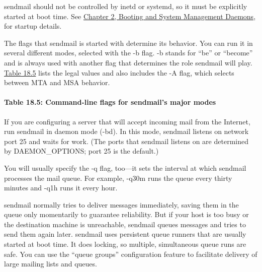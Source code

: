 \protect\hypertarget{part0026_split_026.htmlux5cux23_idIndexMarker2499}{}{}{sendmail}
should not be controlled by {inetd} or {systemd}, so it must be
explicitly started at boot time. See
\protect\hyperlink{part0009_split_000.htmlux5cux23_idTextAnchor065}{Chapter
2, {Booting and System Management Daemons}}, for startup details.

The flags that {sendmail} is started with determine its behavior. You
can run it in several different modes, selected with the {-b} flag. {-b}
stands for ``be'' or ``become'' and is always used with another flag
that determines the role {sendmail} will play.
\protect\hyperlink{part0026_split_026.htmlux5cux23_idTextAnchor1048}{Table
18.5} lists the legal values and also includes the {-A} flag, which
selects between MTA and MSA behavior.

\paragraph[{Table 18.5: }Command-line flags for {sendmail}'s major
modes]{\texorpdfstring{{Table 18.5:
}\protect\hypertarget{part0026_split_026.htmlux5cux23_idIndexMarker2500}{}{}\protect\hypertarget{part0026_split_026.htmlux5cux23_idTextAnchor1048}{}{}\protect\hypertarget{part0026_split_026.htmlux5cux23_idTextAnchor1049}{}{}Command-line
flags for {sendmail}'s major
modes}{Table 18.5: Command-line flags for sendmail's major modes}}


If you are configuring a server that will accept incoming mail from the
Internet, run
\protect\hypertarget{part0026_split_026.htmlux5cux23_idIndexMarker2501}{}{}{sendmail}
in daemon mode ({-bd}). In this mode, {sendmail} listens on network port
25 and waits for work. (The ports that {sendmail} listens on are
determined by {DAEMON\_OPTIONS}; port 25 is the default.)

You will usually specify the {-q} flag, too---it sets the interval
\protect\hypertarget{part0026_split_026.htmlux5cux23_idIndexMarker2502}{}{}at
which {sendmail} processes the mail queue. For example, {-q30m} runs the
queue every thirty minutes and {-q1h} runs it every hour.

{sendmail} normally tries to deliver messages immediately, saving them
in the queue only momentarily to guarantee reliability. But if your host
is too busy or the destination machine is unreachable, {sendmail} queues
messages and tries to send them again later. {sendmail} uses persistent
queue runners that are usually started at boot time. It does locking, so
multiple, simultaneous queue runs are safe. You can use the ``queue
groups'' configuration feature to facilitate delivery of large mailing
lists and queues.

